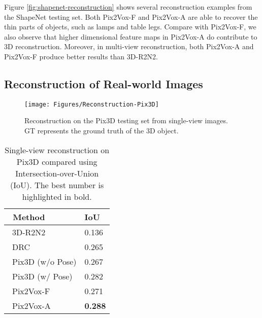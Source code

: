 \documentclass[10pt,twocolumn,letterpaper]{article}
\begin{document}
Figure \ref{fig:shapenet-reconstruction} shows several reconstruction examples from the ShapeNet testing set.
Both Pix2Vox-F and Pix2Vox-A are able to recover the thin parts of objects, such as lamps and table legs.
Compare with Pix2Vox-F, we also observe that higher dimensional feature maps in Pix2Vox-A do contribute to 3D reconstruction.
Moreover, in multi-view reconstruction, both Pix2Vox-A and Pix2Vox-F produce better results than 3D-R2N2.

\subsection{Reconstruction of Real-world Images}
\label{sec:pix3d-reconstruction}

\begin{figure}[!t]
  \centering
  \resizebox{\linewidth}{!} {
    \texttt{[image: Figures/Reconstruction-Pix3D]}
  }
  \caption{Reconstruction on the Pix3D testing set from single-view images. GT represents the ground truth of the 3D object.}
  \label{fig:pix3d-reconstruction}
  \vspace{-2 mm}
\end{figure}

\begin{table}
  \caption{Single-view reconstruction on Pix3D compared using Intersection-over-Union (IoU). The best number is highlighted in bold.}
  \vspace{-2 mm}
  \centering
  \begin{tabularx}{\linewidth}{XY}
    \toprule
    ~Method                                              & IoU \\
    \midrule
    ~3D-R2N2 \cite{DBLP:conf/eccv/ChoyXGCS16}            & 0.136 \\
    ~DRC \cite{DBLP:conf/cvpr/TulsianiZEM17}             & 0.265 \\
    ~Pix3D (w/o Pose) \cite{DBLP:conf/cvpr/Sun0ZZZXTF18} & 0.267 \\
    ~Pix3D (w/ Pose) \cite{DBLP:conf/cvpr/Sun0ZZZXTF18}  & 0.282 \\
    ~Pix2Vox-F                                           & 0.271 \\
    ~Pix2Vox-A                                           & \bf{0.288}\\
    \bottomrule
  \end{tabularx}
  \label{tab:pix3d-reconstruction}
  \vspace{-2 mm}
\end{table}
\end{document}
